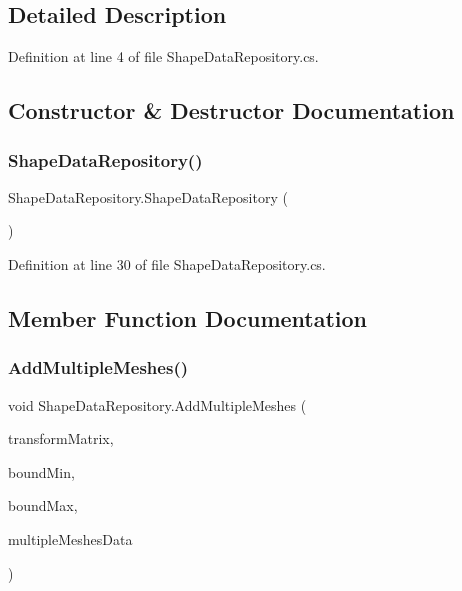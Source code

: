 \subsection{Detailed Description}


Definition at line 4 of file Shape\+Data\+Repository.\+cs.



\subsection{Constructor \& Destructor Documentation}
\mbox{\label{class_shape_data_repository_a72fa4e7e5d207d909ea6f3f37f90e96e}} 
\subsubsection{\texorpdfstring{ShapeDataRepository()}{ShapeDataRepository()}}
{\footnotesize\ttfamily Shape\+Data\+Repository.\+Shape\+Data\+Repository (\begin{DoxyParamCaption}{ }\end{DoxyParamCaption})}



Definition at line 30 of file Shape\+Data\+Repository.\+cs.



\subsection{Member Function Documentation}
\mbox{\label{class_shape_data_repository_a73333f81396a254f00a9732c9512cb05}} 
\subsubsection{\texorpdfstring{AddMultipleMeshes()}{AddMultipleMeshes()}}
{\footnotesize\ttfamily void Shape\+Data\+Repository.\+Add\+Multiple\+Meshes (\begin{DoxyParamCaption}\item[{Matrix4x4}]{transform\+Matrix,  }\item[{Vector3}]{bound\+Min,  }\item[{Vector3}]{bound\+Max,  }\item[{\mbox{\hyperlink{class_multiple_meshes_data}{Multiple\+Meshes\+Data}}}]{multiple\+Meshes\+Data }\end{DoxyParamCaption})}



